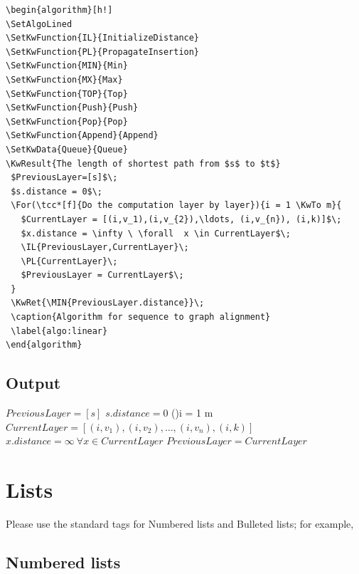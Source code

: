 \documentclass[]{imag-ms-template}
\begin{document}
\begin{verbatim}
\begin{algorithm}[h!]
\SetAlgoLined
\SetKwFunction{IL}{InitializeDistance}
\SetKwFunction{PL}{PropagateInsertion}
\SetKwFunction{MIN}{Min}
\SetKwFunction{MX}{Max}
\SetKwFunction{TOP}{Top}
\SetKwFunction{Push}{Push}
\SetKwFunction{Pop}{Pop}
\SetKwFunction{Append}{Append}
\SetKwData{Queue}{Queue}
\KwResult{The length of shortest path from $s$ to $t$}
 $PreviousLayer=[s]$\;
 $s.distance = 0$\;
 \For(\tcc*[f]{Do the computation layer by layer}){i = 1 \KwTo m}{
   $CurrentLayer = [(i,v_1),(i,v_{2}),\ldots, (i,v_{n}), (i,k)]$\;
   $x.distance = \infty \ \forall  x \in CurrentLayer$\;
   \IL{PreviousLayer,CurrentLayer}\;
   \PL{CurrentLayer}\;
   $PreviousLayer = CurrentLayer$\;
 }
 \KwRet{\MIN{PreviousLayer.distance}}\;
 \caption{Algorithm for sequence to graph alignment}
 \label{algo:linear}
\end{algorithm}
\end{verbatim}

\subsection*{Output}

\begin{algorithm}[h!]
\SetAlgoLined
{}
 $PreviousLayer=[s]$\;
 $s.distance = 0$\;
 \For(){i = 1 \KwTo m}{
   $CurrentLayer = [(i,v_1),(i,v_{2}),\ldots, (i,v_{n}), (i,k)]$\;
   $x.distance = \infty \ \forall  x \in CurrentLayer$\;
   \;
   \;
   $PreviousLayer = CurrentLayer$\;
 }
 \;
 \caption{Algorithm for sequence to graph alignment}
 \label{algo:linear}
\end{algorithm}

\section{Lists}

Please use the standard tags for Numbered lists and Bulleted lists; for example,

\subsection*{Numbered lists}
\end{document}
